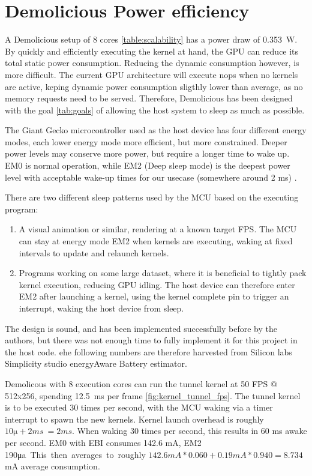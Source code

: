 \documentclass[../main/report.tex]{subfiles}
\begin{document}
\section{Demolicious Power efficiency}

A Demolicious setup of 8 cores \ref{table:scalability} has a power draw of \SI{0.353}{W}.
By quickly and efficiently executing the kernel at hand, the GPU can reduce its total static power consumption.
Reducing the dynamic consumption however, is more difficult.
The current GPU architecture will execute nops when no kernels are active, keping dynamic power consumption sligthly lower than average, as no memory requests need to be served.
Therefore, Demolicious has been designed with the goal \ref{tab:goals} of allowing the host system to sleep as much as possible.

The Giant Gecko microcontroller used as the host device has four different energy modes, each lower energy mode more efficient, but more constrained.
Deeper power levels may conserve more power, but require a longer time to wake up.
EM0 is normal operation, while EM2 (Deep sleep mode) is the deepest power level with acceptable wake-up times for our usecase (somewhere around 2 ms) \cite{efm-referencemanual}.

There are two different sleep patterns used by the MCU based on the executing program:
\begin{enumerate}
  \item
    A visual animation or similar, rendering at a known target FPS.
    The MCU can stay at energy mode EM2 when kernels are executing, waking at fixed intervals to update and relaunch kernels.
  \item
    Programs working on some large dataset, where it is beneficial to tightly pack kernel execution, reducing GPU idling.
    The host device can therefore enter EM2 after launching a kernel, using the kernel complete pin to trigger an interrupt, waking the host device from sleep.
\end{enumerate}

The design is sound, and has been implemented successfully before by the authors,
but there was not enough time to fully implement it for this project in the host code.
ehe following numbers are therefore harvested from Silicon labs Simplicity studio energyAware Battery estimator.

Demolicous with 8 execution cores can run the tunnel kernel at 50 FPS @ 512x256, spending \SI{12.5}{ms} per frame \ref{fig:kernel_tunnel_fps}.
The tunnel kernel is to be executed 30 times per second, with the MCU waking via a timer interrupt to spawn the new kernels.
Kernel launch overhead is roughly $ 10\si\micro + 2 ms ~= 2 ms.$ When waking 30 times per second, this results in 60 ms awake per second.
EM0 with EBI consumes 142.6 mA, EM2 190\si\micro a. This then averages to roughly $ 142.6 mA * 0.060 + 0.19 mA * 0.940 = 8.734$ mA average consumption.
\end{document}
